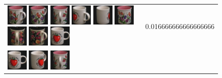 {\begin{figure}[p]
\begin{tabular}{m{11cm} | m{3cm} |}
\includegraphics[width=1cm]{coil/beeld-10.eps}
\includegraphics[width=1cm]{coil/beeld-9.eps}
\includegraphics[width=1cm]{coil/beeld-11.eps}
\includegraphics[width=1cm]{coil/beeld-40.eps}
\includegraphics[width=1cm]{coil/beeld-38.eps}
\includegraphics[width=1cm]{coil/beeld-8.eps}
\includegraphics[width=1cm]{coil/beeld-65.eps}
\includegraphics[width=1cm]{coil/beeld-64.eps}
\includegraphics[width=1cm]{coil/beeld-36.eps}
& {\scriptsize 0.016666666666666666}
\\
\includegraphics[width=1cm]{coil/beeld-36.eps}
\includegraphics[width=1cm]{coil/beeld-39.eps}
\includegraphics[width=1cm]{coil/beeld-11.eps}

\end{tabular}
\end{figure}}
